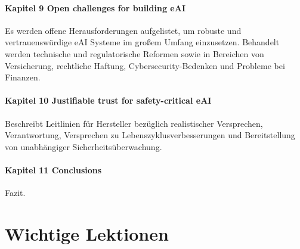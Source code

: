 \paragraph{Kapitel 9 Open challenges for building eAI}
Es werden offene Herausforderungen aufgelistet, um robuste und vertrauenswürdige eAI Systeme im großem Umfang einzusetzen. 
Behandelt werden technische und regulatorische Reformen sowie in Bereichen von Versicherung, rechtliche Haftung, 
Cybersecurity-Bedenken und Probleme bei Finanzen.

\paragraph{Kapitel 10 Justifiable trust for safety-critical eAI}
Beschreibt Leitlinien für Hersteller bezüglich realistischer Versprechen, Verantwortung, 
Versprechen zu Lebenszyklusverbesserungen und Bereitstellung von unabhängiger Sicherheitsüberwachung. 

\paragraph{Kapitel 11 Conclusions}
Fazit.

\section{Wichtige Lektionen}

